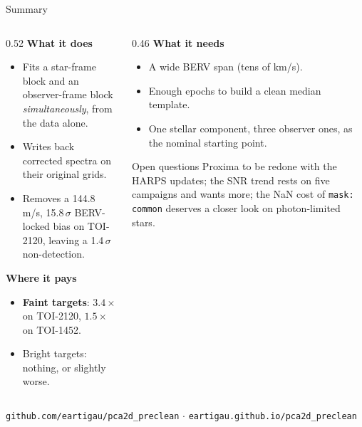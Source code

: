 \documentclass[aspectratio=169,11pt]{beamer}
\begin{document}
\begin{frame}{Summary}

  \begin{columns}[T]
    \begin{column}{0.52\textwidth}
      \textbf{What it does}
      \begin{itemize}\small
        \item Fits a star-frame block and an observer-frame block
          \emph{simultaneously}, from the data alone.
        \item Writes back corrected spectra on their original grids.
        \item Removes a 144.8 m/s, 15.8\,$\sigma$ BERV-locked bias on
          TOI-2120, leaving a 1.4\,$\sigma$ non-detection.
      \end{itemize}

      \vspace{0.5em}
      \textbf{Where it pays}
      \begin{itemize}\small
        \item \textbf{Faint targets}: $3.4\times$ on TOI-2120,
          $1.5\times$ on TOI-1452.
        \item Bright targets: nothing, or slightly worse.
      \end{itemize}
    \end{column}
    \begin{column}{0.46\textwidth}
      \textbf{What it needs}
      \begin{itemize}\small
        \item A wide BERV span (tens of km/s).
        \item Enough epochs to build a clean median template.
        \item One stellar component, three observer ones, as the nominal
          starting point.
      \end{itemize}

      \vspace{0.8em}
      \begin{block}{\small Open questions}
        \small
        Proxima to be redone with the HARPS updates; the SNR trend rests on
        five campaigns and wants more; the NaN cost of \texttt{mask: common}
        deserves a closer look on photon-limited stars.
      \end{block}
    \end{column}
  \end{columns}

  \vspace{0.6em}
  \centering
  \small\color{note}
  \texttt{github.com/eartigau/pca2d\_preclean} \quad$\cdot$\quad
  \texttt{eartigau.github.io/pca2d\_preclean}
\end{frame}
\end{document}
